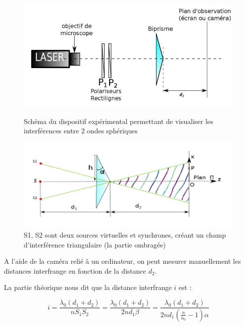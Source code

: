 \documentclass[11pt, a4paper]{article}
\begin{document}
\begin{figure}[htbp]
    \centering
    \begin{minipage}[t]{0.48\textwidth}
        \centering
        \includegraphics[width=\textwidth]{images/montage1.png}
        \caption{Schéma du dispositif expérimental permettant de visualiser les interférences entre 2 ondes sphériques}
        \label{montage1}
    \end{minipage}
    \hfill
    \begin{minipage}[t]{0.48\textwidth}
        \centering
        \includegraphics[width=\textwidth]{images/champs1.png}
        \caption{S1, S2 sont deux sources virtuelles et synchrones, créant un champ d'interférence triangulaire (la partie ombragée)}
        \label{champs1}
    \end{minipage}
\end{figure}
  

A l'aide de la caméra relié à un ordinateur, on peut mesurer manuellement les distances interfrange en fonction de la distance $d_2$.

La partie théorique nous dit que la distance interfrange $i$ est :

$$
    i = \frac{\lambda_0( {d_1 + d_2} )}{nS_1S_2} = \frac{\lambda_0( {d_1 + d_2} )}{2nd_1\beta} = \frac{\lambda_0( {d_1 + d_2} )}{2nd_1\left(\frac{n}{n_0}-1\right)\alpha}
$$
\end{document}
